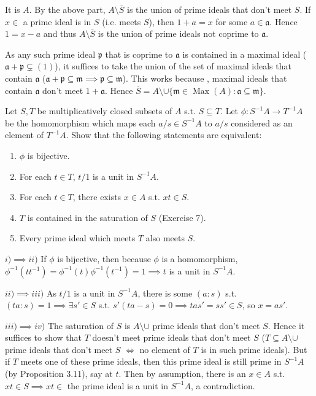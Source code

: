 \begin{questions}
\begin{solution}
	It is $A $.
	By the above part, $A \setminus \overline{S}  $ is the union of prime ideals that don't meet $S $.
	If $x\in $ a prime ideal is in $S $ (i.e. meets $S $), then $1 +a = x $ for some $a \in \mathfrak{a} $.
	Hence $1 = x-a $ and thus $A \setminus \overline{S}$ is the union of prime ideals not coprime to $\mathfrak{a} $.

	As any such prime ideal $\mathfrak{p} $ that is coprime to $\mathfrak{a}$ is contained in a maximal ideal ($\mathfrak{a} + \mathfrak{p} \subsetneq (1) $), it suffices to take the union of the set of maximal ideals that contain $\mathfrak{a} $ ($\mathfrak{a}+\mathfrak{p}\subseteq \mathfrak{m} \implies \mathfrak{p} \subseteq \mathfrak{m} $).
	This works because , maximal ideals that contain $\mathfrak{a} $ don't meet $1 + \mathfrak{a} $.
	Hence $\overline{S} = A \setminus \cup \{\mathfrak{m}\in \operatorname{Max}(A): \mathfrak{a} \subseteq \mathfrak{m}\} $.
\end{solution}

\question Let $S,T $ be multiplicatively closed subsets of $A $ s.t. $S\subseteq T $. Let $\phi : S^{-1}A \to T^{-1}A $ be the homomorphism which maps each $a / s \in S^{-1}A $ to $a/s$ considered as an element of $T^{-1}A $. Show that the following statements are equivalent:
\begin{enumerate}
	\item $\phi  $ is bijective.
	\item For each $t\in T $, $t / 1 $ is a unit in $S^{-1}A $.
	\item For each $t \in T $, there exists $x\in A $ s.t. $xt \in S $.
	\item $T $ is contained in the saturation of $S $ (Exercise 7).
	\item Every prime ideal which meets $T $ also meets $S $.
\end{enumerate}
\begin{solution}
	$i) \implies ii) $ If $\phi  $ is bijective, then because $\phi  $ is a homomorphism, $\phi ^{-1}(t t^{-1}) = \phi ^{-1}(t)\phi ^{-1}(t^{-1}) = 1 \implies t $ is a unit in $S^{-1}A $.

	$ii)\implies iii) $ As $t / 1 $ is a unit in $S^{-1}A $, there is some $(a:s) $ s.t. $(ta:s) = 1 \implies \exists s' \in S $ s.t. $s'(ta-s) = 0 \implies tas' = ss' \in S $, so $x = as' $.

	$iii)\implies iv) $ The saturation of $S $ is $A \setminus \cup  $ prime ideals that don't meet $S $.
	Hence it suffices to show that $T $ doesn't meet prime ideals that don't meet $S $ ($T\subseteq A \setminus \cup $ prime ideals that don't meet $S $ $\iff $ no element of $T $ is in such prime ideals).
	But if $T $ meets one of these prime ideals, then this prime ideal is still prime in $S^{-1}A $ (by Proposition 3.11), say at $t $.
	Then by assumption, there is an $x \in A$ s.t. $xt \in S \implies xt \in$ the prime ideal is a unit in $S^{-1}A $, a contradiction.


\end{solution}
\end{questions}
